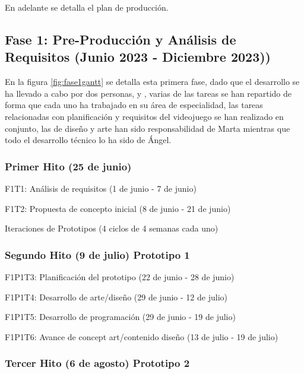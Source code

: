 En adelante se detalla el plan de producción.

\subsection{Fase 1: Pre-Producción y Análisis de Requisitos (Junio 2023 - Diciembre 2023))}

En la figura \ref{fig:fase1gantt} se detalla esta primera fase, dado que el desarrollo se ha llevado a cabo por dos personas, \nombrecoautorespacio y \nombreautor, varias de las tareas se han repartido de forma que cada uno
ha trabajado en su área de especialidad, las tareas relacionadas con planificación y requisitos del videojuego se han realizado en conjunto, las de diseño y arte han sido responsabilidad de Marta mientras que todo el desarrollo 
técnico lo ha sido de Ángel.

\subsubsection{Primer Hito (25 de junio)}
\begin{compactitem}
\item F1T1: Análisis de requisitos (1 de junio - 7 de junio)
\item F1T2: Propuesta de concepto inicial (8 de junio - 21 de junio)
\end{compactitem}
Iteraciones de Prototipos (4 ciclos de 4 semanas cada uno)

\subsubsection{Segundo Hito (9 de julio) Prototipo 1}

\begin{compactitem}
  \item F1P1T3: Planificación del prototipo (22 de junio - 28 de junio)
  \item F1P1T4: Desarrollo de arte/diseño (29 de junio - 12 de julio)
  \item F1P1T5: Desarrollo de programación (29 de junio - 19 de julio)
  \item F1P1T6: Avance de concept art/contenido diseño (13 de julio - 19 de julio)
\end{compactitem}

\subsubsection{Tercer Hito (6 de agosto) Prototipo 2}


